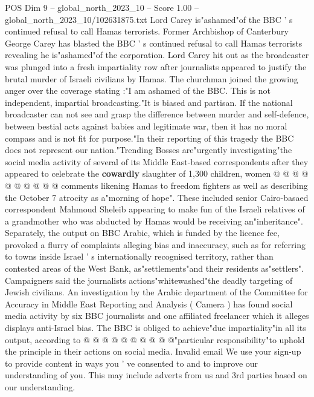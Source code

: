 \begin{textsample}{POS Dim 9 – global\_north\_2023\_10 – Score 1.00 – global\_north\_2023\_10/102631875.txt}  \label{ex:f9_pos_304}
Lord Carey is"ashamed"of the BBC ' s continued refusal to call Hamas terrorists.
Former Archbishop of Canterbury George Carey has blasted the BBC ' s continued refusal to call Hamas terrorists revealing he is"ashamed"of the corporation.
Lord Carey hit out as the broadcaster was plunged into a fresh impartiality row after journalists appeared to justify the brutal murder of Israeli civilians by Hamas.
The churchman joined the growing anger over the coverage stating :"I am ashamed of the BBC.
This is not independent, impartial broadcasting."It is biased and partisan.
If the national broadcaster can not see and grasp the difference between murder and self-defence, between bestial acts against babies and legitimate war, then it has no moral compass and is not fit for purpose."In their reporting of this tragedy the BBC does not represent our nation."Trending Bosses are"urgently investigating"the social media activity of several of its Middle East-based correspondents after they appeared to celebrate the \textbf{cowardly} slaughter of 1,300 children, women @ @ @ @ @ @ @ @ @ @ comments likening Hamas to freedom fighters as well as describing the October 7 atrocity as a"morning of hope".
These included senior Cairo-basaed correspondent Mahmoud Sheleib appearing to make fun of the Israeli relatives of a grandmother who was abducted by Hamas would be receiving an"inheritance".
Separately, the output on BBC Arabic, which is funded by the licence fee, provoked a flurry of complaints alleging bias and inaccuracy, such as for referring to towns inside Israel ' s internationally recognised territory, rather than contested areas of the West Bank, as"settlements"and their residents as"settlers".
Campaigners said the journalists actions"whitewashed"the deadly targeting of Jewish civilians.
An investigation by the Arabic department of the Committee for Accuracy in Middle East Reporting and Analysis ( Camera ) has found social media activity by six BBC journalists and one affiliated freelancer which it alleges displays anti-Israel bias.
The BBC is obliged to achieve"due impartiality"in all its output, according to @ @ @ @ @ @ @ @ @ @"particular responsibility"to uphold the principle in their actions on social media.
Invalid email We use your sign-up to provide content in ways you ' ve consented to and to improve our understanding of you.
This may include adverts from us and 3rd parties based on our understanding.

\end{textsample}
